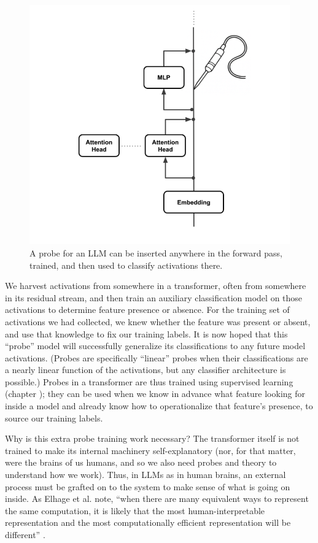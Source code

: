 \begin{figure}[ht]
\centering
\includegraphics[scale=.5]{./images/linearProbe.png}
\caption[Jeff Yoshimi; the line art for the probe was generated by ChatGPT.]{ A
      probe for an LLM can be inserted anywhere in the forward pass, trained,
      and then used to classify activations there.}
\label{linearProbe}
\end{figure}

We harvest activations from somewhere in a transformer, often from somewhere in
its residual stream, and then train an auxiliary classification model on those
activations to determine feature presence or absence. For the training set of
activations we had collected, we knew whether the feature was present or
absent, and use that knowledge to fix our training labels. It is now hoped that
this ``probe'' model will successfully generalize its classifications to any
future model activations. (Probes are specifically ``linear'' probes when their
classifications are a nearly linear function of the activations, but any
classifier architecture is possible.) Probes in a transformer are thus trained
using supervised learning (chapter ); they can be used
when we know in advance what feature looking for inside a model and already
know how to operationalize that feature's presence, to source our training
labels.

Why is this extra probe training work necessary? The transformer itself is not
trained to make its internal machinery self-explanatory (nor, for that matter,
were the brains of us humans, and so we also need probes and theory to
understand how we work). Thus, in LLMs as in human brains, an external process
must be grafted on to the system to make sense of what is going on inside. As
Elhage et al. note, ``when there are many equivalent ways to represent the same
computation, it is likely that the most human-interpretable representation and
the most computationally efficient representation will be different''
\cite{elhage2021mathematical}.

